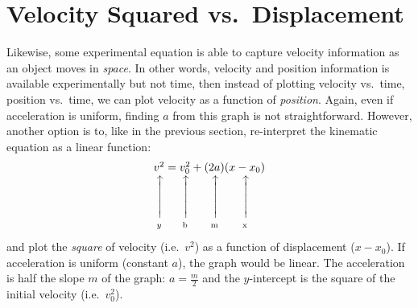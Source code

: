 \documentclass{../../../oss-handout}
\makeatletter
\newcommand\vertarrowbox[2]{%
    \begin{array}[t]{@{}c@{}} #1 \\
    \rotatebox{90}{$\xrightarrow{\hphantom{abcdefgh}}$} \\[-1ex]
    \mathclap{\scriptstyle\text{#2}}%
    \end{array}}
\makeatother
\begin{document}
\section{Velocity Squared vs.\ Displacement}
Likewise, some experimental equation is able to capture velocity information
as an object moves in \emph{space}. In other words, velocity and position
information is available experimentally but not time, then instead of plotting
velocity vs.\ time, position vs.\ time, we can plot velocity as a function of
\emph{position}. Again, even if acceleration is uniform, finding $a$ from this
graph is not straightforward. However, another option is to, like in the
previous section, re-interpret the kinematic equation as a linear function:
\begin{equation}
  \vertarrowbox{v^2}{$y$}=
  \vertarrowbox{v_0^2}{b}+\vertarrowbox{(2a)}{m}
  \vertarrowbox{(x-x_0)}{x}
\end{equation}
and plot the \emph{square} of velocity (i.e.\ $v^2$) as a function of
displacement ($x-x_0$). If acceleration is uniform (constant $a$), the graph
would be linear. The acceleration is half the slope $m$ of the graph:
$\displaystyle a=\frac{m}{2}$ and the $y$-intercept is the square of the
initial velocity (i.e.\ $v_0^2$).
\end{document}
